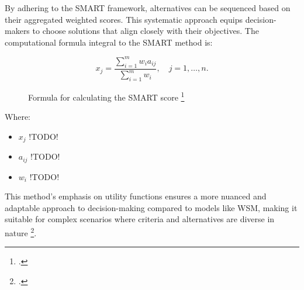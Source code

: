 By adhering to the \ac{SMART} framework, alternatives can be sequenced based on
their aggregated weighted scores. This systematic approach equips
decision-makers to choose solutions that align closely with their objectives.
The computational formula integral to the \ac{SMART} method is:


\begin{figure}[h]
    \centering
    \Large
    \[ x_j = \frac{\sum_{i=1}^{m} w_i a_{ij}}{\sum_{i=1}^{m} w_i}, \quad j = 1, \ldots, n. \]
    \caption{Formula for calculating the \ac*{SMART} score \footcite*{fulopIntroductionDecisionMaking2005}} 
\end{figure}

Where:
\begin{itemize}
    \item \( x_j \) !TODO!
    \item \( a_{ij} \)  !TODO!
    \item \( w_i \) !TODO!
\end{itemize}

This method's emphasis on utility functions ensures a more nuanced and adaptable
approach to decision-making compared to models like WSM, making it suitable for
complex scenarios where criteria and alternatives are diverse in nature \footcite[p. 6]{fulopIntroductionDecisionMaking2005}.